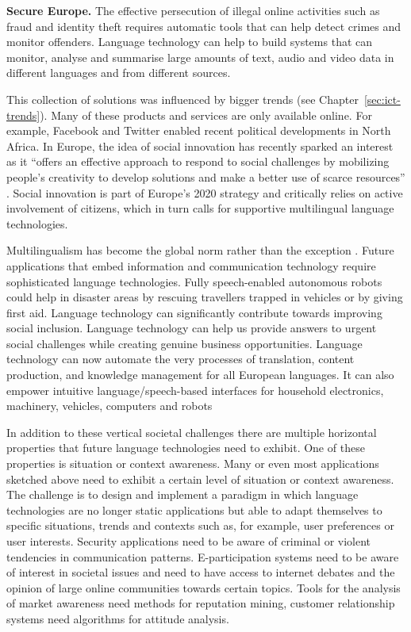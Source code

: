 \documentclass[10pt, plain]{../../metanetpaper}
\begin{document}
\begin{multicols}{2}
\textbf{Secure Europe.} The effective persecution of illegal online activities such as fraud and identity theft requires automatic tools that can help detect crimes and monitor offenders. Language technology can help to build systems that can monitor, analyse and summarise large amounts of text, audio and video data in different languages and from different sources.

This collection of solutions was influenced by bigger trends (see Chapter~\ref{sec:ict-trends}). Many of these products and services are only available online. For example, Facebook and Twitter enabled recent political developments in North Africa. In Europe, the idea of social innovation has recently sparked an interest as it “offers an effective approach to respond to social challenges by mobilizing people's creativity to develop solutions and make a better use of scarce resources” \cite{EC5}. Social innovation is part of Europe’s 2020 strategy and critically relies on active involvement of citizens, which in turn calls for supportive multilingual language technologies.

Multilingualism has become the global norm rather than the exception \cite{maaya2012}. Future applications that embed information and communication technology require sophisticated language technologies. Fully speech-enabled autonomous robots could help in disaster areas by rescuing travellers trapped in vehicles or by giving first aid. Language technology can significantly contribute towards improving social inclusion. Language technology can help us provide answers to urgent social challenges while creating genuine business opportunities.  Language technology can now automate the very processes of translation, content production, and knowledge management for all European languages. It can also empower intuitive language/speech-based interfaces for household electronics, machinery, vehicles, computers and robots

In addition to these vertical societal challenges there are multiple horizontal properties that future language technologies need to exhibit. One of these properties is situation or context awareness. Many or even most applications sketched above need to exhibit a certain level of situation or context awareness. The challenge is to design and implement a paradigm in which language technologies are no longer static applications but able to adapt themselves to specific situations, trends and contexts such as, for example, user preferences or user interests. Security applications need to be aware of criminal or violent tendencies in communication patterns. E-participation systems need to be aware of interest in societal issues and need to have access to internet debates and the opinion of large online communities towards certain topics. Tools for the analysis of market awareness need methods for reputation mining, customer relationship systems need algorithms for attitude analysis.


\end{multicols}
\end{document}

